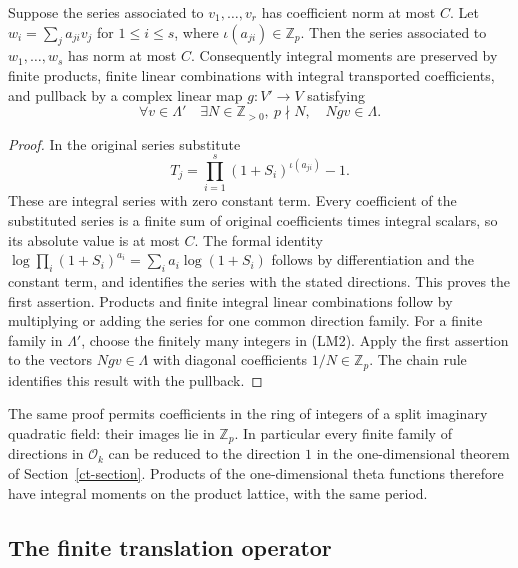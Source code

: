 \begin{lemma}\label{lm-directions}
Suppose the series associated to $v_1,\ldots,v_r$ has coefficient
norm at most $C$.  Let
$w_i=\sum_j a_{ji}v_j$ for $1\le i\le s$, where
$\iota(a_{ji})\in\mathbb Z_p$.  Then the series associated to
$w_1,\ldots,w_s$ has norm at most $C$.
Consequently integral moments are preserved by finite products,
finite linear combinations with integral transported coefficients,
and pullback by a complex linear map $g:V'\to V$ satisfying
\[
 \forall v\in\Lambda'\quad
 \exists N\in\mathbb Z_{>0},\ p\nmid N,\quad Ngv\in\Lambda.
 \tag{LM2}
\]
\end{lemma}
\begin{proof}
In the original series substitute
\[
 T_j=\prod_{i=1}^s(1+S_i)^{\iota(a_{ji})}-1.
 \tag{LM3}
\]
These are integral series with zero constant term.  Every
coefficient of the substituted series is a finite sum of original
coefficients times integral scalars, so its absolute value is at
most $C$.  The formal identity
$\log\prod_i(1+S_i)^{a_i}=\sum_i a_i\log(1+S_i)$ follows by
differentiation and the constant term, and identifies the series
with the stated directions.  This proves the first assertion.
Products and finite integral linear combinations follow by
multiplying or adding the series for one common direction family.
For a finite family in $\Lambda'$, choose the finitely many
integers in (LM2).  Apply the first assertion to the vectors
$Ngv\in\Lambda$ with diagonal coefficients $1/N\in\mathbb Z_p$.
The chain rule identifies this result with the pullback.
\end{proof}

The same proof permits coefficients in the ring of integers of a
split imaginary quadratic field: their images lie in $\mathbb Z_p$.
In particular every finite family of directions in
$\mathcal O_k$ can be reduced to the direction $1$ in the
one-dimensional theorem of Section~\ref{ct-section}.  Products of
the one-dimensional theta functions therefore have integral
moments on the product lattice, with the same period.

\subsection{The finite translation operator}

